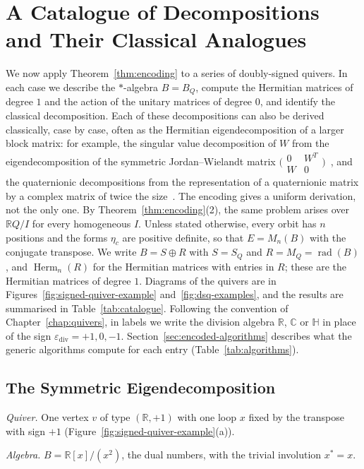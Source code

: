 \documentclass[12pt, a4paper]{report}
\theoremstyle{plain}
\theoremstyle{definition}
\theoremstyle{remark}
\theoremstyle{plain}
\newcommand{\rad}[0]{\operatorname{rad}} %
\newcommand{\epsilondiv}{\varepsilon_{\mathrm{div}}}
\newcommand{\RR}{\mathbb{R}}
\newcommand{\CC}{\mathbb{C}}
\newcommand{\HH}{\mathbb{H}}
\newcommand{\Herm}{\operatorname{Herm}}
\begin{document}
\section{A Catalogue of Decompositions and Their Classical Analogues}
\label{sec:catalogue}
We now apply Theorem~\ref{thm:encoding} to a series of doubly-signed quivers. In each case we describe the $*$-algebra $B=B_Q$, compute the Hermitian matrices of degree $1$ and the action of the unitary matrices of degree $0$, and identify the classical decomposition. Each of these decompositions can also be derived classically, case by case, often as the Hermitian eigendecomposition of a larger block matrix: for example, the singular value decomposition of $W$ from the eigendecomposition of the symmetric Jordan--Wielandt matrix $\bigl(\begin{smallmatrix}0&W^T\\W&0\end{smallmatrix}\bigr)$~\cite{GolubVanLoan2013}, and the quaternionic decompositions from the representation of a quaternionic matrix by a complex matrix of twice the size~\cite{Zhang1997}. The encoding gives a uniform derivation, not the only one. By Theorem~\ref{thm:encoding}(2), the same problem arises over $\RR Q/I$ for every homogeneous $I$. Unless stated otherwise, every orbit has $n$ positions and the forms $\eta_c$ are positive definite, so that $E=M_n(B)$ with the conjugate transpose. We write $B=S\oplus R$ with $S=S_Q$ and $R=M_Q=\rad(B)$, and $\Herm_n(R)$ for the Hermitian matrices with entries in $R$; these are the Hermitian matrices of degree $1$. Diagrams of the quivers are in Figures~\ref{fig:signed-quiver-example} and~\ref{fig:dsq-examples}, and the results are summarised in Table~\ref{tab:catalogue}. Following the convention of Chapter~\ref{chap:quivers}, in labels we write the division algebra $\RR$, $\CC$ or $\HH$ in place of the sign $\epsilondiv=+1,0,-1$. Section~\ref{sec:encoded-algorithms} describes what the generic algorithms compute for each entry (Table~\ref{tab:algorithms}).

\subsection{The Symmetric Eigendecomposition}
\label{subsec:cat-symmetric}
\emph{Quiver.} One vertex $v$ of type $(\RR,+1)$ with one loop $x$ fixed by the transpose with sign $+1$ (Figure~\ref{fig:signed-quiver-example}(a)).

\emph{Algebra.} $B=\RR[x]/(x^2)$, the dual numbers, with the trivial involution $x^*=x$.
\end{document}

